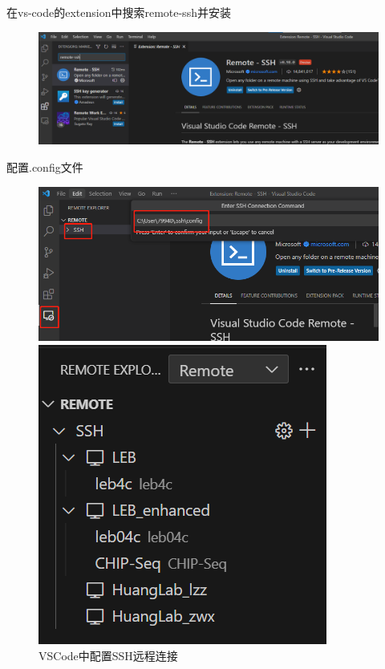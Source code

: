 在vs-code的extension中搜索remote-ssh并安装
\begin{figure}[ht]
    \centering
    \includegraphics[width=13cm]{image/env/vsc-plugin.png}
\end{figure}

配置.config文件
\begin{figure}[ht]
    \centering
    \begin{minipage}[c]{0.65\textwidth}
        \includegraphics[width=\textwidth]{image/env/vs-ssh-config.png}
    \end{minipage}
    \begin{minipage}[c]{0.3\textwidth}
        \includegraphics[width=\textwidth]{image/env/vs-remote.png}
    \end{minipage}
    \caption{VSCode中配置SSH远程连接}
    \label{vs-ssh}
\end{figure}

